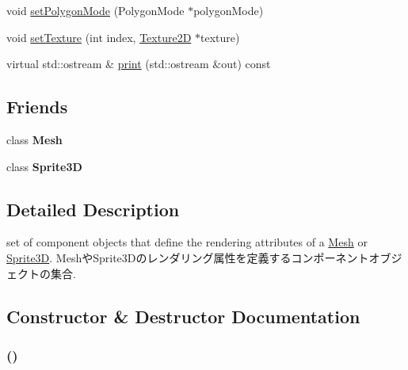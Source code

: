 \begin{CompactItemize}
\item 
void \hyperlink{classm3g_1_1Appearance_cc21fac7868e2ad37e689ac642db1aae}{setPolygonMode} (PolygonMode $\ast$polygonMode)
\item 
void \hyperlink{classm3g_1_1Appearance_493e54b1c7ab839b9e76b28e0629cf6a}{setTexture} (int index, \hyperlink{classm3g_1_1Texture2D}{Texture2D} $\ast$texture)
\item 
virtual std::ostream \& \hyperlink{classm3g_1_1Appearance_6fea17fa1532df3794f8cb39cb4f911f}{print} (std::ostream \&out) const 
\end{CompactItemize}
\subsection*{Friends}
\begin{CompactItemize}
\item 
\hypertarget{classm3g_1_1Appearance_a41a130f156b145bffb3f4b5172c4c93}{
class \textbf{Mesh}}
\label{classm3g_1_1Appearance_a41a130f156b145bffb3f4b5172c4c93}

\item 
\hypertarget{classm3g_1_1Appearance_639cf38c41878a4f0fc8d24c010c96de}{
class \textbf{Sprite3D}}
\label{classm3g_1_1Appearance_639cf38c41878a4f0fc8d24c010c96de}

\end{CompactItemize}


\subsection{Detailed Description}
set of component objects that define the rendering attributes of a \hyperlink{classm3g_1_1Mesh}{Mesh} or \hyperlink{classm3g_1_1Sprite3D}{Sprite3D}. MeshやSprite3Dのレンダリング属性を定義するコンポーネントオブジェクトの集合. 

\subsection{Constructor \& Destructor Documentation}
\hypertarget{classm3g_1_1Appearance_2e594c7b96cb5cfad839a98b57f5d42f}{
\subsubsection[{Appearance}]{ ()}}
\label{classm3g_1_1Appearance_2e594c7b96cb5cfad839a98b57f5d42f}


